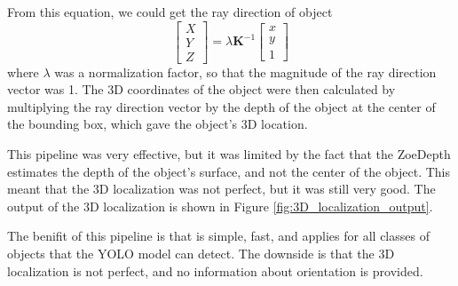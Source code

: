 From this equation, we could get the ray direction of object
\begin{equation}\label{eq:ray_direction}
    \begin{bmatrix}
        X \\
        Y \\
        Z
    \end{bmatrix}
    =
    \lambda \mathbf{K}^{-1}\begin{bmatrix}
        x \\
        y \\
        1
    \end{bmatrix} 
\end{equation}
where $\lambda$ was a normalization factor, so that the magnitude of the ray direction vector was 1. The 3D coordinates of the object were then calculated by multiplying the ray direction vector by the depth of the object at the center of the bounding box, which gave the object's 3D location.

This pipeline was very effective, but it was limited by the fact that the ZoeDepth estimates the depth of the object's surface, and not the center of the object. This meant that the 3D localization was not perfect, but it was still very good. The output of the 3D localization is shown in Figure \ref{fig:3D_localization_output}.

The benifit of this pipeline is that is simple, fast, and applies for all classes of objects that the YOLO model can detect. The downside is that the 3D localization is not perfect, and no information about orientation is provided.

